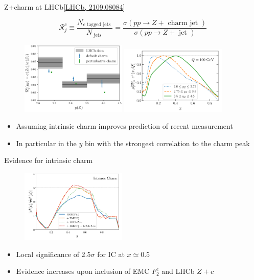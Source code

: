 \documentclass[aspectratio=43, 8pt,t]{beamer}
\begin{document}
\begin{frame}{Z+charm at LHCb}{\color{gray}\footnotesize [\hyperlink{https://arxiv.org/abs/2109.08084}{LHCb, 2109.08084}]}

  \begin{equation*}
    \mathcal{R}_j^c \equiv \frac{N_{c \text { tagged jets }}}{N_\text { jets }  }=\frac{\sigma\left(p p \rightarrow Z+\text { charm jet } \right)}{\sigma\left(p p \rightarrow Z+\text { jet }  \right)}
  \end{equation*}
  \begin{figure}
    \includegraphics[width=0.45\textwidth]{lhcb_data.png}
    \includegraphics[width=0.45\textwidth]{charm_Rjet_corr.png}
  \end{figure}
  \begin{itemize}
    \item Assuming intrinsic charm improves prediction of recent measurement
    \item In particular in the $y$ bin with the strongest correlation to the charm peak
  \end{itemize}
\end{frame}

\begin{frame}{Evidence for intrinsic charm}
  \begin{figure}
    \includegraphics[width=0.45\textwidth]{ic_f2c_zc.png}
  \end{figure}
  \begin{itemize}
    \item Local significance of 2.5$\sigma$ for IC at $x\simeq 0.5$
    \item Evidence increases upon inclusion of EMC $F_2^c$ and LHCb $Z+c$
  \end{itemize}
\end{frame}
\end{document}

